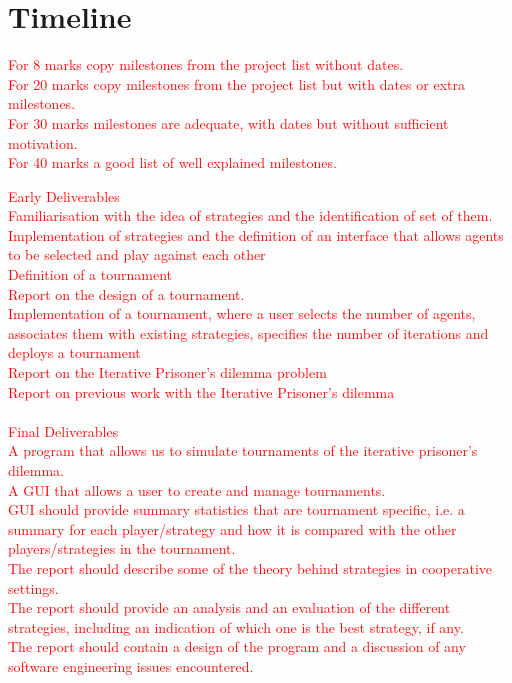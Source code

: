 \documentclass{article}
\begin{document}
\section*{Timeline}

\textcolor{red}{For 8 marks copy milestones from the project list without dates.\\For 20 marks copy milestones from the project list but with dates or extra milestones.\\For 30 marks milestones are adequate, with dates but without sufficient motivation.\\For 40 marks a good list of well explained milestones.}

\textcolor{red}{\noindent Early Deliverables\\
Familiarisation with the idea of strategies and the identification of set of them.\\
Implementation of strategies and the definition of an interface that allows agents to be selected and play against each other\\
Definition of a tournament\\
Report on the design of a tournament.\\
Implementation of a tournament, where a user selects the number of agents, associates them with existing strategies, specifies the number of iterations and deploys a tournament\\
Report on the Iterative Prisoner's dilemma problem\\
Report on previous work with the Iterative Prisoner's dilemma\\\\
 Final Deliverables\\
A program that allows us to simulate tournaments of the iterative prisoner's dilemma.\\
A GUI that allows a user to create and manage tournaments.\\
GUI should provide summary statistics that are tournament specific, i.e. a summary for each player/strategy and how it is compared with the other players/strategies in the tournament.\\
The report should describe some of the theory behind strategies in cooperative settings.\\
The report should provide an analysis and an evaluation of the different strategies, including an indication of which one is the best strategy, if any.\\
The report should contain a design of the program and a discussion of any software engineering issues encountered.\\
}
\end{document}
